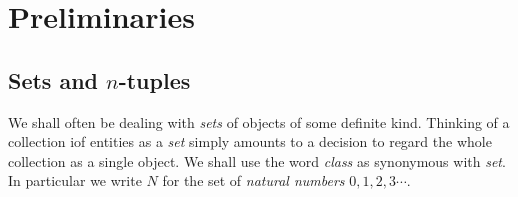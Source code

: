 \documentclass[a4paper,10pt,twoside]{book}
\begin{document}

\restoregeometry
\thispagestyle{empty}
\setcounter{page}{0}
\tableofcontents
\thispagestyle{empty}
\setcounter{page}{0}


\chapter{Preliminaries}
\section{Sets and $n$-tuples}

We shall often be dealing with \textit{sets} of objects of some definite kind. Thinking of a collection iof entities as a \textit{set} simply amounts to a decision to regard the whole collection as a single object. We shall use the word \textit{class} as synonymous with \textit{set}. In particular we write $N$ for the set of \textit{natural numbers} $0,1,2,3\cdots$.
\end{document}
